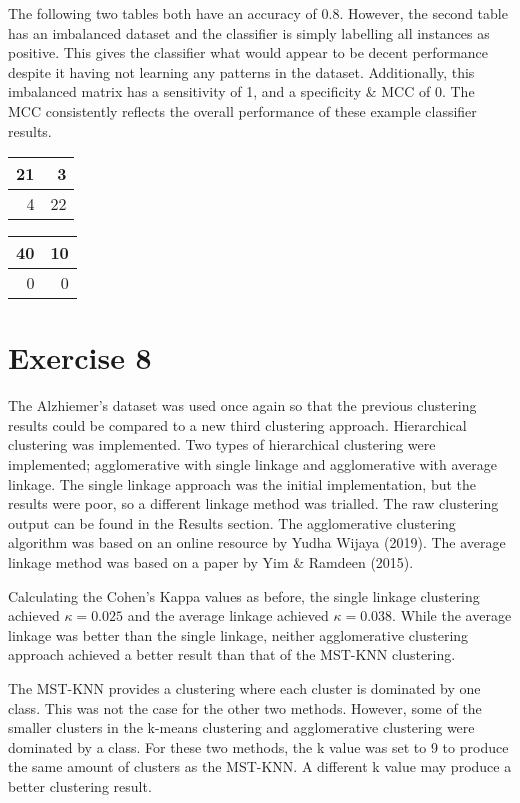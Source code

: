 \documentclass[11pt, a4paper]{article}
\begin{document}
The following two tables both have an accuracy of 0.8. However, the second table has an imbalanced dataset and the classifier is simply labelling all instances as positive. This gives the classifier what would appear to be decent performance despite it having not learning any patterns in the dataset. Additionally, this imbalanced matrix has a sensitivity of 1, and a specificity \& MCC of 0. The MCC consistently reflects the overall performance of these example classifier results.

\begin{center}
\begin{tabular}{|r|r|}
\hline
21 & 3\\
\hline
4 & 22\\
\hline
\end{tabular}
\qquad
\begin{tabular}{|r|r|}
\hline
40 & 10\\
\hline
0 & 0\\
\hline
\end{tabular}
\end{center}

\section{Exercise 8}
The Alzhiemer's dataset was used once again so that the previous clustering results could be compared to a new third clustering approach. Hierarchical clustering was implemented. Two types of hierarchical clustering were implemented; agglomerative with single linkage and agglomerative with average linkage. The single linkage approach was the initial implementation, but the results were poor, so a different linkage method was trialled. The raw clustering output can be found in the Results section. The agglomerative clustering algorithm was based on an online resource by Yudha Wijaya (2019). The average linkage method was based on a paper by Yim \& Ramdeen (2015).

Calculating the Cohen's Kappa values as before, the single linkage clustering achieved $\kappa = 0.025$ and the average linkage achieved $\kappa = 0.038$. While the average linkage was better than the single linkage, neither agglomerative clustering approach achieved a better result than that of the MST-KNN clustering.

The MST-KNN provides a clustering where each cluster is dominated by one class. This was not the case for the other two methods. However, some of the smaller clusters in the k-means clustering and agglomerative clustering were dominated by a class. For these two methods, the k value was set to 9 to produce the same amount of clusters as the MST-KNN. A different k value may produce a better clustering result.
\end{document}
